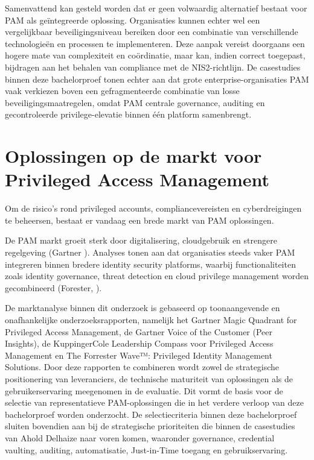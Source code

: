 Samenvattend kan gesteld worden dat er geen volwaardig alternatief bestaat voor PAM als geïntegreerde oplossing. Organisaties kunnen echter wel een vergelijkbaar beveiligingsniveau bereiken door een combinatie van verschillende technologieën en processen te implementeren. Deze aanpak vereist doorgaans een hogere mate van complexiteit en coördinatie, maar kan, indien correct toegepast, bijdragen aan het behalen van compliance met de NIS2-richtlijn. De casestudies binnen deze bachelorproef tonen echter aan dat grote enterprise-organisaties PAM vaak verkiezen boven een gefragmenteerde combinatie van losse beveiligingsmaatregelen, omdat PAM centrale governance, auditing en gecontroleerde privilege-elevatie binnen één platform samenbrengt.

\section{Oplossingen op de markt voor Privileged Access Management}

Om de risico’s rond privileged accounts, compliancevereisten en cyberdreigingen te beheersen, bestaat er vandaag een brede markt van PAM oplossingen. 

De PAM markt groeit sterk door digitalisering, cloudgebruik en strengere regelgeving (Gartner \cite{GartnerMagicQuadrantPAM2025}). Analyses tonen aan dat organisaties steeds vaker PAM integreren binnen bredere identity security platforms, waarbij functionaliteiten zoals identity governance, threat detection en cloud privilege management worden gecombineerd (Forester, \cite{ForresterWavePIM2025}).

De marktanalyse binnen dit onderzoek is gebaseerd op toonaangevende en onafhankelijke onderzoeksrapporten, namelijk het Gartner Magic Quadrant for Privileged Access Management, de Gartner Voice of the Customer (Peer Insights), de KuppingerCole Leadership Compass voor Privileged Access Management en The Forrester Wave™: Privileged Identity Management Solutions. Door deze rapporten te combineren wordt zowel de strategische positionering van leveranciers, de technische maturiteit van oplossingen als de gebruikerservaring meegenomen in de evaluatie. Dit vormt de basis voor de selectie van representatieve PAM-oplossingen die in het verdere verloop van deze bachelorproef worden onderzocht. De selectiecriteria binnen deze bachelorproef sluiten bovendien aan bij de strategische prioriteiten die binnen de casestudies van Ahold Delhaize naar voren komen, waaronder governance, credential vaulting, auditing, automatisatie, Just-in-Time toegang en gebruikservaring.

